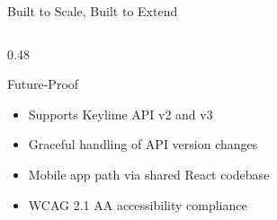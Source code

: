 \begin{frame}{Built to Scale, Built to Extend}
\begin{columns}[T]
\begin{column}{0.48\textwidth}
      \vspace{0.1cm}

      \begin{exampleblock}{Future-Proof}
        \tiny
        \begin{itemize}
          \item Supports Keylime API v2 and v3
          \item Graceful handling of API version changes
          \item Mobile app path via shared React codebase
          \item WCAG 2.1 AA accessibility compliance
        \end{itemize}
      \end{exampleblock}
    \end{column}
  \end{columns}
\end{frame}
